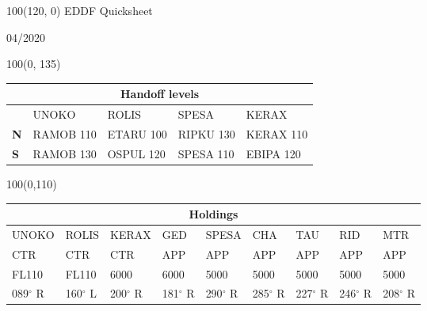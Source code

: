\documentclass[10pt,landscape,a4paper]{article}
\begin{document}
\begin{textblock}{100}(120, 0)
  \large
  \centering
  EDDF Quicksheet

  04/2020
\end{textblock}

\begin{textblock}{100}(0, 135)
\begin{table}[]
\begin{tabular}{|l|l|l|l|l|}
\multicolumn{5}{c}{\textbf{Handoff levels}}              \\ \hline
           & UNOKO     & ROLIS     & SPESA     & KERAX     \\ \hline
\textbf{N} & RAMOB 110 & ETARU 100 & RIPKU 130 & KERAX 110 \\
\textbf{S} & RAMOB 130 & OSPUL 120 & SPESA 110 & EBIPA 120 \\ \hline
\end{tabular}
\end{table}
\end{textblock}

\begin{textblock}{100}(0,110)
\begin{table}[]
\begin{tabular}{|l|l|l|l|l|l|l|l|l|}

\multicolumn{9}{c}{\textbf{Holdings}}                                        \\ \hline
UNOKO  & ROLIS  & KERAX  & GED    & SPESA  & CHA    & TAU    & RID    & MTR    \\ \hline
CTR    & CTR    & CTR    & APP    & APP    & APP    & APP    & APP    & APP    \\
FL110  & FL110  & 6000   & 6000   & 5000   & 5000   & 5000   & 5000   & 5000   \\
089$^\circ$ R & 160$^\circ$ L & 200$^\circ$ R & 181$^\circ$ R & 290$^\circ$ R & 285$^\circ$ R & 227$^\circ$ R & 246$^\circ$ R & 208$^\circ$ R \\ \hline
\end{tabular}
\end{table}
\end{textblock}
\end{document}
